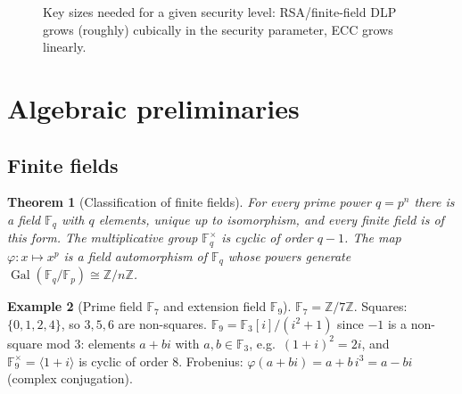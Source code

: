 \documentclass[11pt,a4paper,oneside]{book}
\theoremstyle{plain}
\newtheorem{theorem}{Theorem}[chapter]
\theoremstyle{definition}
\newtheorem{example}[theorem]{Example}
\theoremstyle{remark}
\newcommand{\Z}{\mathbb{Z}}
\newcommand{\F}{\mathbb{F}}
\newcommand{\Gal}{\operatorname{Gal}}
\newcommand{\Frob}{\varphi}
\begin{document}
\begin{figure}[ht]
\centering
{}
\caption{Key sizes needed for a given security level: RSA/finite-field DLP grows (roughly) cubically in the security parameter, ECC grows linearly.}
\label{fig:keysizes}
\end{figure}

\section{Algebraic preliminaries}

\subsection{Finite fields}

\begin{theorem}[Classification of finite fields]\label{thm:finite-fields}
For every prime power $q=p^n$ there is a field $\F_q$ with $q$ elements, unique up to isomorphism, and every finite field is of this form.
The multiplicative group $\F_q^\times$ is cyclic of order $q-1$. The map $\Frob:x\mapsto x^p$ is a field automorphism of $\F_q$ whose powers generate $\Gal(\F_q/\F_p)\cong\Z/n\Z$.
\end{theorem}

\begin{example}[Prime field $\F_7$ and extension field $\F_9$]
$\F_7=\Z/7\Z$. Squares: $\{0,1,2,4\}$, so $3,5,6$ are non-squares. $\F_9=\F_3[i]/(i^2+1)$ since $-1$ is a non-square mod $3$:
elements $a+bi$ with $a,b\in\F_3$, e.g.\ $(1+i)^2=2i$, and $\F_9^\times=\langle 1+i\rangle$ is cyclic of order $8$. Frobenius: $\Frob(a+bi)=a+b\,i^3=a-bi$ (complex conjugation).
\end{example}
\end{document}
